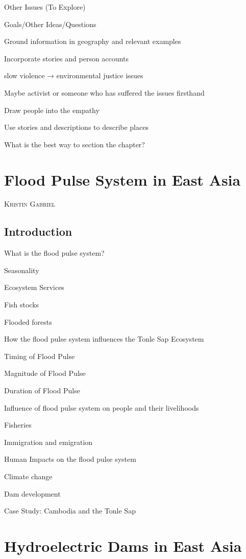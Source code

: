\documentclass{book}\usepackage{knitr}
\makeatletter
\newcommand{\chapterauthor}[1]{%
  {\parindent0pt\vspace*{-25pt}%
  \linespread{1.1}\large\scshape#1%
  \par\nobreak\vspace*{35pt}}
  \@afterheading%
}
\makeatother
\begin{document}
\begin{knitrout}
\begin{kframe}
Other Issues (To Explore)

Goals/Other Ideas/Questions

Ground information in geography and relevant examples

Incorporate stories and person accounts

slow violence → environmental justice issues

Maybe activist or someone who has suffered the issues firsthand

Draw people into the empathy

Use stories and descriptions to describe places

What is the best way to section the chapter?


\chapter{Flood Pulse System in East Asia}

\chapterauthor{Kristin Gabriel}

\section{Introduction}

What is the flood pulse system?

Seasonality

Ecosystem Services

Fish stocks

Flooded forests

How the flood pulse system influences the Tonle Sap Ecosystem

Timing of Flood Pulse

Magnitude of Flood Pulse

Duration of Flood Pulse

Influence of flood pulse system on people and their livelihoods

Fisheries

Immigration and emigration

Human Impacts on the flood pulse system

Climate change

Dam development

Case Study: Cambodia and the Tonle Sap


\chapter{Hydroelectric Dams in East Asia}


\end{kframe}
\end{knitrout}
\end{document}
